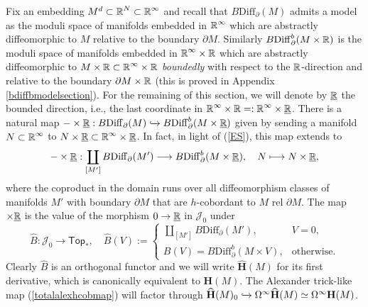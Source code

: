 \documentclass[a4paper, oneside]{amsart}
\newcommand{\diff}{\mathrm{Diff}}
\newcommand{\1}{\mathds{1}}
\theoremstyle{remark}
\theoremstyle{definition}
\newcommand{\R}{{\scaleobj{0.97}{\mathbb{R}}}}
\newcommand{\Hsp}{\mathbf{H}}
\numberwithin{equation}{section}
\begin{document}
Fix an embedding $M^d\subset \R^N\subset \R^\infty$ and recall that $B\diff_\partial(M)$ admits a model as the moduli space of manifolds embedded in $\R^\infty$ which are abstractly diffeomorphic to $M$ relative to the boundary $\partial M$. Similarly $B\diff_\partial^b(M\times \R)$ is the moduli space of manifolds embedded in $\R^\infty\times \R$ which are abstractly diffeomorphic to $M\times \R\subset \R^\infty\times \R$ \textit{boundedly} with respect to the $\R$-direction and relative to the boundary $\partial M\times \R$ (this is proved in Appendix \ref{bdiffbmodelsection}). For the remaining of this section, we will denote by $\underline\R$ the bounded direction, i.e., the last coordinate in $\R^\infty\times \R=:\R^\infty\times\underline\R$. There is a natural map $-\times\underline\R: B\diff_\partial(M)\xhookrightarrow{} B\diff^b_\partial(M\times\underline{\R})$ given by sending a manifold $N\subset \R^\infty$ to $N\times\underline \R\subset \R^\infty\times\underline \R$. In fact, in light of (\ref{ES}), this map extends to
$$
-\times \underline{\R}: \coprod_{[M']} B\diff_\partial(M')\longrightarrow B\diff^b_\partial(M\times \underline{\R}), \quad N\longmapsto N\times \underline{\R},
$$
where the coproduct in the domain runs over all diffeomorphism classes of manifolds $M'$ with boundary $\partial M$ that are $h$-cobordant to $M$ rel $\partial M$. The map $\times\underline{\R}$ is the value of the morphism $0\to \underline{\R}$ in $\mathcal{J}_0$ under
$$
\widehat{B}: \mathcal{J}_0\longrightarrow \mathsf{Top}_*, \quad \widehat{B}(V):=\left\{\begin{array}{cc}
    \coprod_{[M']} B\diff_\partial(M'), & V=0, \\[5pt]
    B(V)=B\diff^b_\partial(M\times V), & \text{otherwise}.
\end{array}
\right.
$$
Clearly $\widehat{B}$ is an orthogonal functor and we will write $\widehat{\Hsp}(M)$ for its first derivative, which is canonically equivalent to $\Hsp(M)$. The Alexander trick-like map (\ref{totalalexhcobmap}) will factor through
$
\widehat{\Hsp}(M)_0\xhookrightarrow{}\Omega^\infty \widehat{\Hsp}(M)\simeq \Omega^\infty \Hsp(M)
$.
\end{document}
